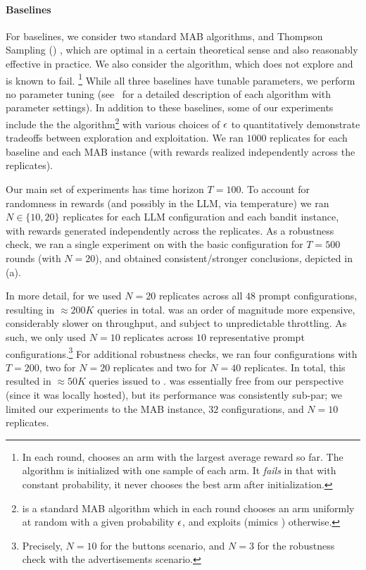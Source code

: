 \paragraph{Baselines}
For baselines, we consider two standard MAB algorithms, \ucb \citep{bandits-ucb1} and Thompson Sampling (\ts) \citep{Thompson-1933}, which are optimal in a certain theoretical sense and also reasonably effective in practice. We also consider the \greedy algorithm, which does not explore and is known to fail.%
\footnote{\label{fn:greedy}In each round, \greedy chooses an arm with the largest average reward so far. The algorithm is initialized with one sample of each arm. It \emph{fails} in that with constant probability, it never chooses the best arm after initialization.}
While all three baselines have tunable parameters,
we perform no parameter tuning (see~ for a detailed description of each algorithm with parameter settings). In addition to these baselines, some of our experiments include the the \EpsGreedy algorithm\footnote{\label{fn:eps-greedy}\EpsGreedy is a standard MAB algorithm which in each round chooses an arm uniformly at random with a given probability $\epsilon$, and exploits (\ie mimics \greedy) otherwise.} with various choices of $\epsilon$ to quantitatively demonstrate tradeoffs between exploration and exploitation.
We ran $1000$ replicates for each baseline and each MAB instance (with rewards realized independently across the replicates).


Our main set of experiments has time horizon $T=100$.
To account for randomness in rewards (and possibly in the LLM, via temperature) we ran $N \in \{10, 20\}$ replicates for each LLM configuration and each bandit instance, with rewards generated independently across the replicates.
As a robustness check, we ran a single experiment on \gptfour with the basic configuration for $T=500$ rounds (with $N=20$), and obtained consistent/stronger conclusions, depicted in (a).

In more detail, for \gptthree we used $N=20$ replicates across all $48$ prompt configurations, resulting in $\approx 200K$ queries in total.
\gptfour was an order of magnitude more expensive, considerably slower on throughput, and subject to unpredictable throttling.
As such, we only used $N=10$ replicates across $10$ representative prompt configurations.\footnote{Precisely, $N=10$ for the buttons scenario, and $N=3$ for the robustness check with the advertisements scenario.}
For additional robustness checks, we ran four \gptfour configurations with $T=200$, two for $N=20$ replicates and two for $N=40$ replicates.
In total, this resulted in ${\approx}50K$ queries issued to \gptfour.
\llama was essentially free from our perspective (since it was locally hosted), but its performance was consistently sub-par; we limited our experiments to the \hard MAB instance, $32$ configurations, and $N=10$ replicates.



